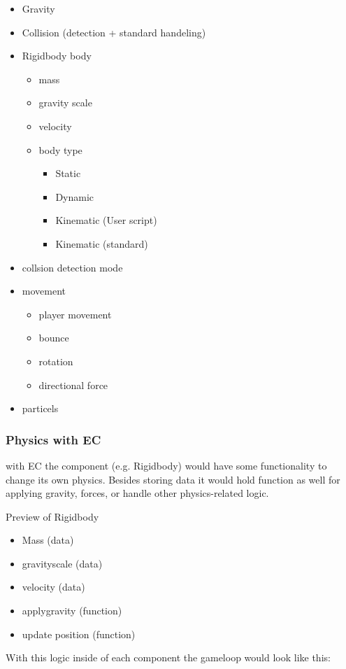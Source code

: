 \documentclass{projdoc}
\begin{document}
\begin{itemize}
    \item Gravity
    \item Collision (detection + standard handeling)
    \item Rigidbody body
    \begin{itemize}
		\item mass
		\item gravity scale
		\item velocity
		\item body type
		\begin{itemize}
			\item Static
			\item Dynamic
			\item Kinematic (User script)
			\item Kinematic (standard)
		\end{itemize}
	\end{itemize}
	\item collsion detection mode
    \item movement
    \begin{itemize}
		\item player movement
		\item bounce
		\item rotation
		\item directional force
	\end{itemize}
	\item particels
\end{itemize}

\subsubsection{Physics with EC}
with EC the component (e.g. Rigidbody) would have some functionality to change its own physics. Besides storing data it would hold function as well for applying gravity, forces, or handle other physics-related logic.

Preview of Rigidbody
\begin{itemize}
	\item Mass (data)
	\item gravityscale (data)
	\item velocity (data)
	\item applygravity (function)
	\item update position (function)
\end{itemize}

With this logic inside of each component the gameloop would look like this:
\end{document}
